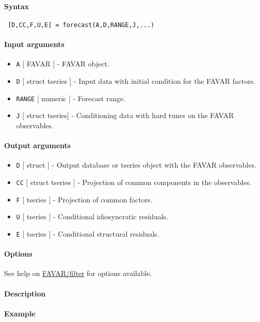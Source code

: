 


	\paragraph{Syntax}
 
 \begin{verbatim}
 [D,CC,F,U,E] = forecast(A,D,RANGE,J,...)
 \end{verbatim}
 
 \paragraph{Input arguments}
 
 \begin{itemize}
 \item
   \texttt{A} {[} FAVAR {]} - FAVAR object.
 \item
   \texttt{D} {[} struct \textbar{} tseries {]} - Input data with initial
   condition for the FAVAR factors.
 \item
   \texttt{RANGE} {[} numeric {]} - Forecast range.
 \item
   \texttt{J} {[} struct \textbar{} tseries{]} - Conditioning data with
   hard tunes on the FAVAR observables.
 \end{itemize}
 
 \paragraph{Output arguments}
 
 \begin{itemize}
 \item
   \texttt{D} {[} struct {]} - Output database or tseries object with the
   FAVAR observables.
 \item
   \texttt{CC} {[} struct \textbar{} tseries {]} - Projection of common
   components in the observables.
 \item
   \texttt{F} {[} tseries {]} - Projection of common factors.
 \item
   \texttt{U} {[} tseries {]} - Conditional idiosyncratic residuals.
 \item
   \texttt{E} {[} tseries {]} - Conditional structural residuals.
 \end{itemize}
 
 \paragraph{Options}
 
 See help on \url{FAVAR/filter} for options available.
 
 \paragraph{Description}
 
 \paragraph{Example}


